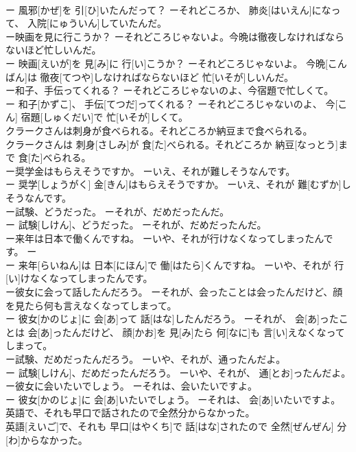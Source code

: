 \documentclass[8pt]{extreport}
\begin{document}
\begin{CJK}{UTF8}{min}
\\	ー 風邪[かぜ]を 引[ひ]いたんだって？ ーそれどころか、 肺炎[はいえん]になって、 入院[にゅういん]していたんだ。
\\	ー映画を見に行こうか？ ーそれどころじゃないよ。今晩は徹夜しなければならないほど忙しいんだ。	
\\	ー 映画[えいが]を 見[み]に 行[い]こうか？ ーそれどころじゃないよ。 今晩[こんばん]は 徹夜[てつや]しなければならないほど 忙[いそが]しいんだ。
\\	ー和子、手伝ってくれる？ ーそれどころじゃないのよ、今宿題で忙しくて。	
\\	ー 和子[かずこ]、 手伝[てつだ]ってくれる？ ーそれどころじゃないのよ、 今[こん] 宿題[しゅくだい]で 忙[いそが]しくて。
\\	クラークさんは刺身が食べられる。それどころか納豆まで食べられる。	
\\	クラークさんは 刺身[さしみ]が 食[た]べられる。それどころか 納豆[なっとう]まで 食[た]べられる。
\\	ー奨学金はもらえそうですか。 ーいえ、それが難しそうなんです。	
\\	ー 奨学[しょうがく] 金[きん]はもらえそうですか。 ーいえ、それが 難[むずか]しそうなんです。
\\	ー試験、どうだった。 ーそれが、だめだったんだ。	
\\	ー 試験[しけん]、どうだった。 ーそれが、だめだったんだ。
\\	ー来年は日本で働くんですね。 ーいや、それが行けなくなってしまったんです。	ー
\\	ー 来年[らいねん]は 日本[にほん]で 働[はたら]くんですね。 ーいや、それが 行[い]けなくなってしまったんです。
\\	ー彼女に会って話したんだろう。 ーそれが、会ったことは会ったんだけど、顔を見たら何も言えなくなってしまって。	
\\	ー 彼女[かのじょ]に 会[あ]って 話[はな]したんだろう。 ーそれが、 会[あ]ったことは 会[あ]ったんだけど、 顔[かお]を 見[み]たら 何[なに]も 言[い]えなくなってしまって。
\\	ー試験、だめだったんだろう。 ーいや、それが、通ったんだよ。	
\\	ー 試験[しけん]、だめだったんだろう。 ーいや、それが、 通[とお]ったんだよ。
\\	ー彼女に会いたいでしょう。 ーそれは、会いたいですよ。	
\\	ー 彼女[かのじょ]に 会[あ]いたいでしょう。 ーそれは、 会[あ]いたいですよ。
\\	英語で、それも早口で話されたので全然分からなかった。	
\\	英語[えいご]で、それも 早口[はやくち]で 話[はな]されたので 全然[ぜんぜん] 分[わ]からなかった。

\end{CJK}
\end{document}
